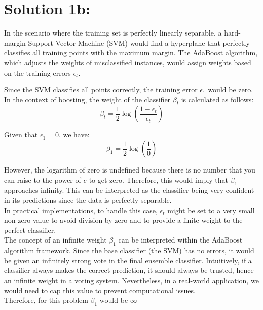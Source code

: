 \documentclass[10pt]{article}
\begin{document}
\section*{Solution 1b:}

In the scenario where the training set is perfectly linearly separable, a hard-margin Support Vector Machine (SVM) would find a hyperplane that perfectly classifies all training points with the maximum margin. The AdaBoost algorithm, which adjusts the weights of misclassified instances, would assign weights based on the training errors $\epsilon_t$.

Since the SVM classifies all points correctly, the training error $\epsilon_1$ would be zero. In the context of boosting, the weight of the classifier $\beta_t$ is calculated as follows:
\begin{equation}
\beta_t = \frac{1}{2} \log\left(\frac{1 - \epsilon_t}{\epsilon_t}\right)
\end{equation}

Given that $\epsilon_1 = 0$, we have:
\begin{equation}
\beta_1 = \frac{1}{2} \log\left(\frac{1}{0}\right)
\end{equation}

However, the logarithm of zero is undefined because there is no number that you can raise to the power of $e$ to get zero. Therefore, this would imply that $\beta_1$ approaches infinity. This can be interpreted as the classifier being very confident in its predictions since the data is perfectly separable. \\

In practical implementations, to handle this case, $\epsilon_t$ might be set to a very small non-zero value to avoid division by zero and to provide a finite weight to the perfect classifier. \\

The concept of an infinite weight $\beta_1$ can be interpreted within the AdaBoost algorithm framework. Since the base classifier (the SVM) has no errors, it would be given an infinitely strong vote in the final ensemble classifier. Intuitively, if a classifier always makes the correct prediction, it should always be trusted, hence an infinite weight in a voting system. Nevertheless, in a real-world application, we would need to cap this value to prevent computational issues. \\

Therefore, for this problem $\beta_1$ would be $\infty$
\end{document}

